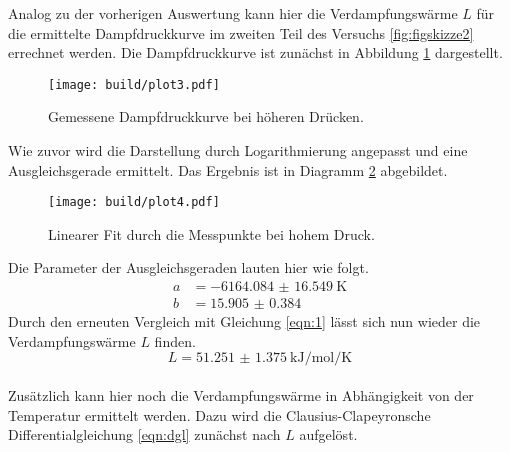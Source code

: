 Analog zu der vorherigen Auswertung kann hier die Verdampfungswärme $L$ für die ermittelte Dampfdruckkurve im zweiten Teil des Versuchs \ref{fig:figskizze2} errechnet werden.
Die Dampfdruckkurve ist zunächst in Abbildung \ref{fig:plot3} dargestellt.
\begin{figure}[h]
    \centering
    \texttt{[image: build/plot3.pdf]}
    \caption{Gemessene Dampfdruckkurve bei höheren Drücken.}
    \label{fig:plot3}
\end{figure}
Wie zuvor wird die Darstellung durch Logarithmierung angepasst und eine Ausgleichsgerade ermittelt. Das Ergebnis ist in Diagramm \ref{fig:plot4} abgebildet.
\begin{figure}[h]
    \centering
    \texttt{[image: build/plot4.pdf]}
    \caption{Linearer Fit durch die Messpunkte bei hohem Druck.}
    \label{fig:plot4}
\end{figure}
Die Parameter der Ausgleichsgeraden lauten hier wie folgt.
\begin{align}
    a &= \SI{-6164.084(16549)}{\kelvin} \\
    b &= \SI{15.905(0384)}{}
\end{align}
Durch den erneuten Vergleich mit Gleichung \eqref{eqn:1} lässt sich nun wieder die Verdampfungswärme $L$ finden.
\begin{equation}
L = \SI{51.251(1375)}{\kilo\joule\per\mol\per\kelvin}
\end{equation}
\\
Zusätzlich kann hier noch die Verdampfungswärme in Abhängigkeit von der Temperatur ermittelt werden. Dazu wird die Clausius-Clapeyronsche
Differentialgleichung \eqref{eqn:dgl} zunächst nach $L$ aufgelöst.

